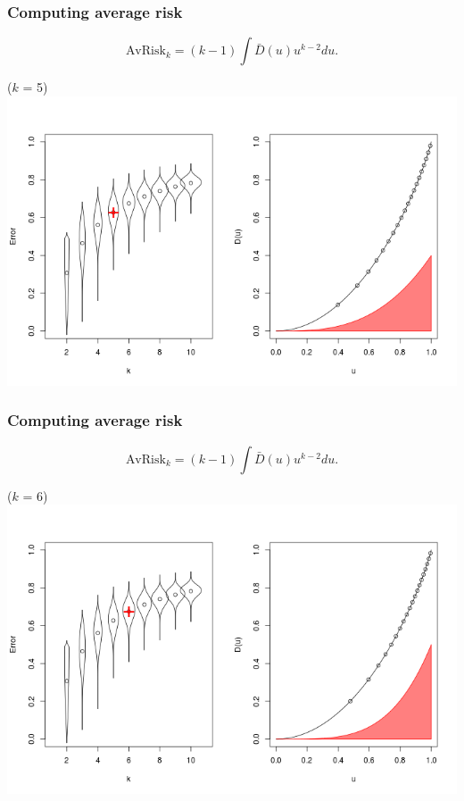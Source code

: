 \documentclass{beamer}
\begin{document}
\begin{frame}
\frametitle{Computing average risk}
\[
\text{AvRisk}_k = (k-1) \int \bar{D}(u) u^{k-2} du.
\]
\begin{center}
($k$ = 5)
\includegraphics[scale = 0.4, clip=true, trim=0 0.1in 0 0.7in]{../extrapolation/rho_0_7_fmla5.png}
\end{center}
\end{frame}

\begin{frame}
\frametitle{Computing average risk}
\[
\text{AvRisk}_k = (k-1) \int \bar{D}(u) u^{k-2} du.
\]
\begin{center}
($k$ = 6)
\includegraphics[scale = 0.4, clip=true, trim=0 0.1in 0 0.7in]{../extrapolation/rho_0_7_fmla6.png}
\end{center}
\end{frame}
\end{document}
